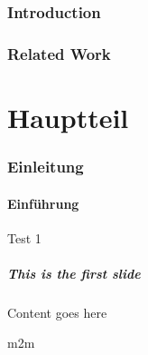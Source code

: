 \section{Introduction}
\label{sec:intro}







\section{Related Work}
\label{sec:RelWork}


%
\begin{frame}[plain]%
\titlepage%
\end{frame}%
%
%
\part{Hauptteil}
\begingroup\AtBeginSection[]{}
\section{Einleitung}%
\endgroup
\subsection{Einführung}%


\begin{frame}{Test 1}
	\frametitle{This is the first slide}
	Content goes here

	\gls{m2m}
\end{frame}


